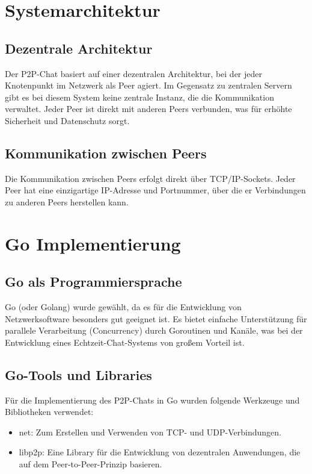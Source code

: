\section{Systemarchitektur}

\subsection{Dezentrale Architektur}
Der P2P-Chat basiert auf einer dezentralen Architektur, bei der jeder Knotenpunkt im Netzwerk als Peer agiert. Im Gegensatz zu zentralen Servern gibt es bei diesem System keine zentrale Instanz, die die Kommunikation verwaltet. Jeder Peer ist direkt mit anderen Peers verbunden, was für erhöhte Sicherheit und Datenschutz sorgt.

\subsection{Kommunikation zwischen Peers}
Die Kommunikation zwischen Peers erfolgt direkt über TCP/IP-Sockets. Jeder Peer hat eine einzigartige IP-Adresse und Portnummer, über die er Verbindungen zu anderen Peers herstellen kann.

\section{Go Implementierung}

\subsection{Go als Programmiersprache}

Go (oder Golang) wurde gewählt, da es für die Entwicklung von Netzwerksoftware besonders gut geeignet ist. Es bietet einfache Unterstützung für parallele Verarbeitung (Concurrency) durch Goroutinen und Kanäle, was bei der Entwicklung eines Echtzeit-Chat-Systems von großem Vorteil ist.

\subsection {Go-Tools und Libraries}

Für die Implementierung des P2P-Chats in Go wurden folgende Werkzeuge und Bibliotheken verwendet:

\begin{itemize}
    \item net: Zum Erstellen und Verwenden von TCP- und UDP-Verbindungen.
    \item libp2p: Eine Library für die Entwicklung von dezentralen Anwendungen, die auf dem Peer-to-Peer-Prinzip basieren.
\end{itemize}

